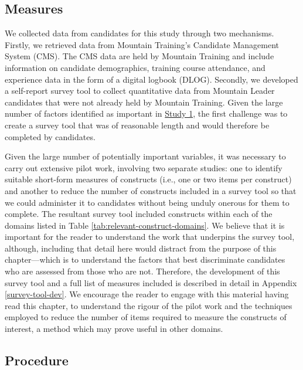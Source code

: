 \documentclass[
  12pt,
  a4paper,
]{book}
\begin{document}
\hypertarget{pra-measures}{%
\subsection{Measures}\label{pra-measures}}

We collected data from candidates for this study through two mechanisms. Firstly, we retrieved data from Mountain Training's Candidate Management System (CMS). The CMS data are held by Mountain Training and include information on candidate demographics, training course attendance, and experience data in the form of a digital logbook (DLOG). Secondly, we developed a self-report survey tool to collect quantitative data from Mountain Leader candidates that were not already held by Mountain Training. Given the large number of factors identified as important in \protect\hyperlink{ml-qualitative}{Study 1}, the first challenge was to create a survey tool that was of reasonable length and would therefore be completed by candidates.

Given the large number of potentially important variables, it was necessary to carry out extensive pilot work, involving two separate studies: one to identify suitable short-form measures of constructs (i.e., one or two items per construct) and another to reduce the number of constructs included in a survey tool so that we could administer it to candidates without being unduly onerous for them to complete. The resultant survey tool included constructs within each of the domains listed in Table \ref{tab:relevant-construct-domains}. We believe that it is important for the reader to understand the work that underpins the survey tool, although, including that detail here would distract from the purpose of this chapter---which is to understand the factors that best discriminate candidates who are assessed from those who are not. Therefore, the development of this survey tool and a full list of measures included is described in detail in Appendix \ref{survey-tool-dev}. We encourage the reader to engage with this material having read this chapter, to understand the rigour of the pilot work and the techniques employed to reduce the number of items required to measure the constructs of interest, a method which may prove useful in other domains.

\hypertarget{pra-procedure}{%
\subsection{Procedure}\label{pra-procedure}}
\end{document}
